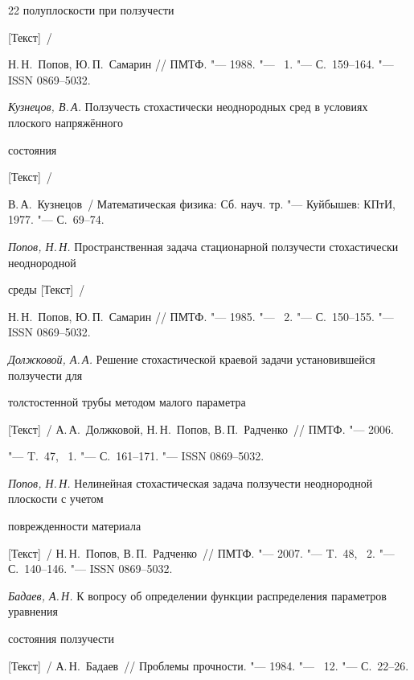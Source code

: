 \begin{thebibliography}{22}
полуплоскости при ползучести 

[Текст]~/ 

Н.\,Н.~Попов, Ю.\,П.~Самарин /\!/ ПМТФ. "--- 1988. "--- \No~1. "--- С.~159--164. "--- ISSN 0869--5032.



\item \textit{Кузнецов, В.\,А.} Ползучесть стохастически неоднородных сред в условиях плоского напряжённого 

состояния 

[Текст]~/ 

В.\,А.~Кузнецов~/ Математическая физика: Сб. науч. тр. "--- Куйбышев: КПтИ, 1977. "--- С.~69--74.



\item \textit{Попов, Н.\,Н.} Пространственная задача стационарной ползучести стохастически неоднородной 

среды [Текст]~/ 

Н.\,Н.~Попов, Ю.\,П.~Самарин /\!/ ПМТФ. "--- 1985. "--- \No~2. "--- С.~150--155. "--- ISSN 0869--5032.



\item \textit{Должковой, А.\,А.} Решение стохастической краевой задачи установившейся ползучести для 

толстостенной трубы методом малого параметра 

[Текст]~/ А.\,А.~Должковой, Н.\,Н.~Попов, В.\,П.~Радченко~/\!/ ПМТФ. "--- 2006.

"--- T.~47, \No~1. "--- С.~161--171. "--- ISSN 0869--5032.



\item \textit{Попов, Н.\,Н.} Нелинейная стохастическая задача ползучести неоднородной плоскости с учетом 

поврежденности материала 

[Текст]~/ Н.\,Н.~Попов, В.\,П.~Радченко~/\!/ ПМТФ. "---  2007. "--- T.~48, \No~2. "---  С.~140--146. "--- ISSN 0869--5032.



\item \textit{Бадаев, А.\,Н.} К вопросу об определении функции распределения параметров уравнения 

состояния ползучести 

[Текст]~/ А.\,Н.~Бадаев~/\!/ Проблемы прочности. "--- 1984. "--- \No~12. "--- С.~22--26.




\end{thebibliography}

